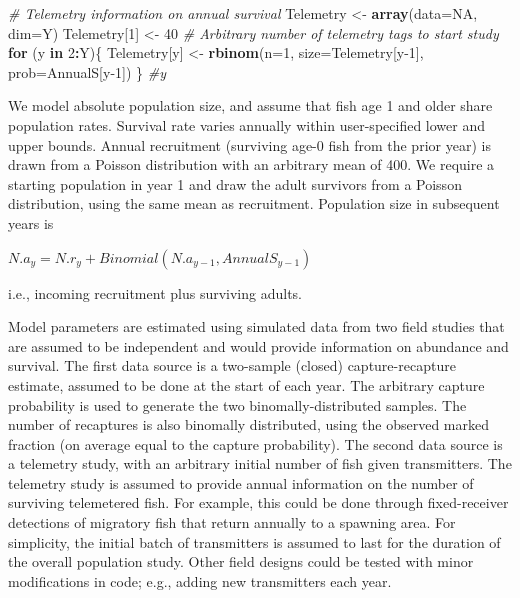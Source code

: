 \documentclass[
]{krantz}
\makeatletter
\newenvironment{Shaded}{\begin{snugshade}}{\end{snugshade}}
\newcommand{\AttributeTok}[1]{\textcolor[rgb]{0.27,0.27,0.27}{#1}}
\newcommand{\CommentTok}[1]{\textcolor[rgb]{0.37,0.37,0.37}{\textit{#1}}}
\newcommand{\ConstantTok}[1]{\textcolor[rgb]{0.37,0.37,0.37}{#1}}
\newcommand{\ControlFlowTok}[1]{\textcolor[rgb]{0.27,0.27,0.27}{\textbf{#1}}}
\newcommand{\DecValTok}[1]{\textcolor[rgb]{0.06,0.06,0.06}{#1}}
\newcommand{\FunctionTok}[1]{\textcolor[rgb]{0.27,0.27,0.27}{\textbf{#1}}}
\newcommand{\NormalTok}[1]{#1}
\newcommand{\OtherTok}[1]{\textcolor[rgb]{0.37,0.37,0.37}{#1}}
\newcommand{\SpecialCharTok}[1]{\textcolor[rgb]{0.43,0.43,0.43}{\textbf{#1}}}
\newenvironment{kframe}{%
\medskip{}
\setlength{\fboxsep}{.8em}
 \def\at@end@of@kframe{}%
 \ifinner\ifhmode%
  \def\at@end@of@kframe{\end{minipage}}%
  \begin{minipage}{\columnwidth}%
 \fi\fi%
 \def\FrameCommand##1{\hskip\@totalleftmargin \hskip-\fboxsep
 \colorbox{shadecolor}{##1}\hskip-\fboxsep
     \hskip-\linewidth \hskip-\@totalleftmargin \hskip\columnwidth}%
 \MakeFramed {\advance\hsize-\width
   \@totalleftmargin\z@ \linewidth\hsize
   \@setminipage}}%
 {\par\unskip\endMakeFramed%
 \at@end@of@kframe}
\renewenvironment{Shaded}{\begin{kframe}}{\end{kframe}}
\makeatother
\begin{document}
\begin{Shaded}
\begin{Highlighting}[]
\CommentTok{\# Telemetry information on annual survival}
\NormalTok{Telemetry }\OtherTok{\textless{}{-}} \FunctionTok{array}\NormalTok{(}\AttributeTok{data=}\ConstantTok{NA}\NormalTok{, }\AttributeTok{dim=}\NormalTok{Y)}
\NormalTok{Telemetry[}\DecValTok{1}\NormalTok{] }\OtherTok{\textless{}{-}} \DecValTok{40} \CommentTok{\# Arbitrary number of telemetry tags to start study}
\ControlFlowTok{for}\NormalTok{ (y }\ControlFlowTok{in} \DecValTok{2}\SpecialCharTok{:}\NormalTok{Y)\{}
\NormalTok{  Telemetry[y] }\OtherTok{\textless{}{-}} \FunctionTok{rbinom}\NormalTok{(}\AttributeTok{n=}\DecValTok{1}\NormalTok{, }\AttributeTok{size=}\NormalTok{Telemetry[y}\DecValTok{{-}1}\NormalTok{], }\AttributeTok{prob=}\NormalTok{AnnualS[y}\DecValTok{{-}1}\NormalTok{])}
\NormalTok{\} }\CommentTok{\#y}
\end{Highlighting}
\end{Shaded}

We model absolute population size, and assume that fish age 1 and older share population rates. Survival rate varies annually within user-specified lower and upper bounds. Annual recruitment (surviving age-0 fish from the prior year) is drawn from a Poisson distribution with an arbitrary mean of 400. We require a starting population in year 1 and draw the adult survivors from a Poisson distribution, using the same mean as recruitment. Population size in subsequent years is

\(N.a_y = N.r_y + Binomial(N.a_{y-1}, AnnualS_{y-1})\)

i.e., incoming recruitment plus surviving adults.

Model parameters are estimated using simulated data from two field studies that are assumed to be independent and would provide information on abundance and survival. The first data source is a two-sample (closed) capture-recapture estimate, assumed to be done at the start of each year. The arbitrary capture probability is used to generate the two binomally-distributed samples. The number of recaptures is also binomally distributed, using the observed marked fraction (on average equal to the capture probability). The second data source is a telemetry study, with an arbitrary initial number of fish given transmitters. The telemetry study is assumed to provide annual information on the number of surviving telemetered fish. For example, this could be done through fixed-receiver detections of migratory fish that return annually to a spawning area. For simplicity, the initial batch of transmitters is assumed to last for the duration of the overall population study. Other field designs could be tested with minor modifications in code; e.g., adding new transmitters each year.
\end{document}

